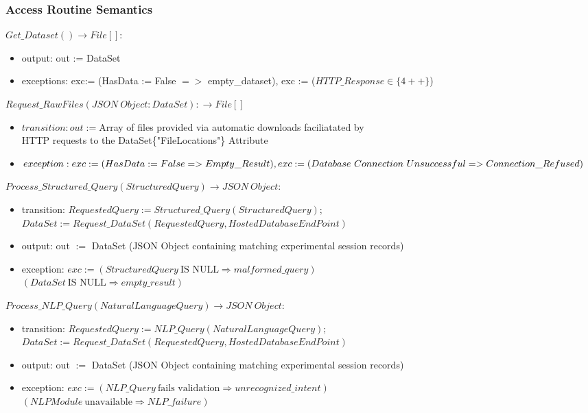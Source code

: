 \documentclass[12pt, titlepage]{article}
\begin{document}
\subsubsection{Access Routine Semantics}

\noindent $Get\_Dataset() \rightarrow File[]$:
\begin{itemize}
\item output: out := DataSet
\item exceptions: exc:= (HasData := False $=>$ empty\_dataset), exc := ($HTTP\_Response \in \{4++\}$)
\end{itemize}

\noindent $Request\_RawFiles(JSON~Object: DataSet): \rightarrow File[]$
\begin{itemize}
  \item{$transition: out := $Array of files provided via automatic downloads faciliatated by \\ HTTP requests to the DataSet\{"FileLocations"\} Attribute}
  \item{$exception: exc := (HasData := False => Empty\_Result), \\ exc := (Database~Connection~Unsuccessful => Connection\_Refused)$}

\end{itemize}


\noindent $Process\_Structured\_Query(StructuredQuery) \rightarrow JSON~Object$:
\begin{itemize}
\item transition: $RequestedQuery := Structured\_Query(StructuredQuery)$; $DataSet := Request\_DataSet(RequestedQuery, HostedDatabaseEndPoint)$
\item output: out $:=$ DataSet (JSON Object containing matching experimental session records)
\item exception: $exc := (StructuredQuery~\text{IS NULL} \Rightarrow malformed\_query)$ \\
$(DataSet~\text{IS NULL} \Rightarrow empty\_result)$
\end{itemize}

\noindent $Process\_NLP\_Query(NaturalLanguageQuery) \rightarrow JSON~Object$:
\begin{itemize}
\item transition: $RequestedQuery := NLP\_Query(NaturalLanguageQuery)$; $DataSet := Request\_DataSet(RequestedQuery, HostedDatabaseEndPoint)$
\item output: out $:=$ DataSet (JSON Object containing matching experimental session records)
\item exception: $exc := (NLP\_Query~\text{fails validation} \Rightarrow unrecognized\_intent)$ \\
$(NLPModule~\text{unavailable} \Rightarrow NLP\_failure)$
\end{itemize}
\end{document}
